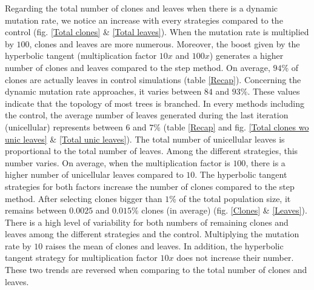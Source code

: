 \documentclass[a4paper]{article}
\begin{document}
\begin{multicols}{2}
Regarding the total number of clones and leaves when there is a dynamic mutation rate, we notice an increase with every strategies compared to the control (fig. \ref{Total clones} \& \ref{Total leaves}). When the mutation rate is multiplied by $100$, clones and leaves are more numerous. Moreover, the boost given by the hyperbolic tangent (multiplication factor $10x$ and $100x$) generates a higher number of clones and leaves compared to the step method. On average, $94$\% of clones are actually leaves in control simulations (table \ref{Recap}). Concerning the dynamic mutation rate approaches, it varies between $84$ and $93$\%. These values indicate that the topology of most trees is branched. In every methods including the control, the average number of leaves generated during the last iteration (unicellular) represents between $6$ and $7$\% (table \ref{Recap} and fig. \ref{Total clones wo unic leaves} \& \ref{Total unic leaves}). The total number of unicellular leaves is proportional to the total number of leaves. Among the different strategies, this number varies. On average, when the multiplication factor is $100$, there is a higher number of unicellular leaves compared to $10$. The hyperbolic tangent strategies for both factors increase the number of clones compared to the step method. After selecting clones bigger than $1$\% of the total population size, it remains between $0.0025$ and $0.015$\% clones (in average) (fig. \ref{Clones} \& \ref{Leaves}). There is a high level of variability for both numbers of remaining clones and leaves among the different strategies and the control. Multiplying the mutation rate by $10$ raises the mean of clones and leaves. In addition, the hyperbolic tangent strategy for multiplication factor $10x$ does not increase their number. These two trends are reversed when comparing to the total number of clones and leaves.


\end{multicols}
\end{document}
